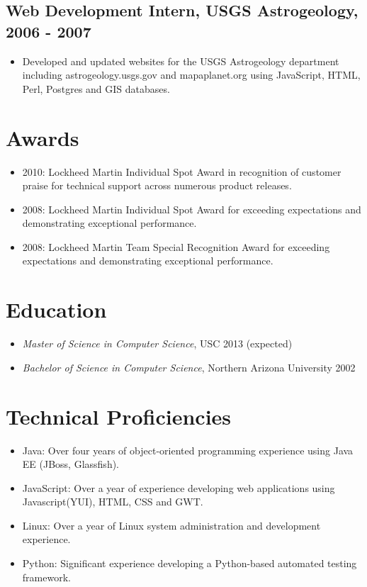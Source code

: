 \documentclass[11pt]{article}
\begin{document}
\subsection*{Web Development Intern, USGS Astrogeology, 2006 - 2007}
\label{sec-1.2}

\begin{itemize}
\item Developed and updated websites for the USGS Astrogeology department including astrogeology.usgs.gov and mapaplanet.org using JavaScript, HTML, Perl, Postgres and GIS databases.
\end{itemize}
\section*{Awards}
\label{sec-2}

\begin{itemize}
\item 2010: Lockheed Martin Individual Spot Award in recognition of customer praise for technical support across numerous product releases.
\item 2008: Lockheed Martin Individual Spot Award for exceeding expectations and demonstrating exceptional performance.
\item 2008: Lockheed Martin Team Special Recognition Award for exceeding expectations and demonstrating exceptional performance.
\end{itemize}
\section*{Education}
\label{sec-3}

\begin{itemize}
\item \emph{Master of Science in Computer Science}, USC 2013 (expected)
\item \emph{Bachelor of Science in Computer Science}, Northern Arizona University 2002
\end{itemize}
\section*{Technical Proficiencies}
\label{sec-4}

\begin{itemize}
\item Java: Over four years of object-oriented programming experience using Java EE (JBoss, Glassfish).
\item JavaScript: Over a year of experience developing web applications using Javascript(YUI), HTML, CSS and GWT.
\item Linux: Over a year of Linux system administration and development experience.
\item Python: Significant experience developing a Python-based automated testing framework.
\end{itemize}
\end{document}
